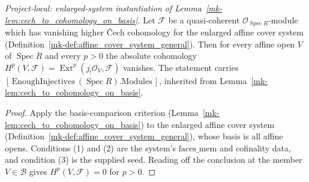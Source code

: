 \begin{lemma}\label{mk-lem:affine_serre_vanishing_general_of_seed}
  \leanok

  \textit{Project-local: enlarged-system instantiation of
  Lemma~\ref{mk-lem:cech_to_cohomology_on_basis}.}
  Let \(\mathcal{F}\) be a quasi-coherent \(\mathcal{O}_{\operatorname{Spec} R}\)-module which has vanishing
  higher {\v C}ech cohomology for the enlarged affine cover system
  (Definition~\ref{mk-def:affine_cover_system_general}). Then for every affine open \(V\) of
  \(\operatorname{Spec} R\) and every \(p > 0\) the absolute cohomology
  \(H^p(V, \mathcal{F}) = \operatorname{Ext}^p(j_!\mathcal{O}_V, \mathcal{F})\) vanishes. The statement
  carries \([\,\mathrm{EnoughInjectives}\ (\operatorname{Spec} R).\mathrm{Modules}\,]\), inherited from
  Lemma~\ref{mk-lem:cech_to_cohomology_on_basis}.
\end{lemma}
\begin{proof}
  \leanok
  Apply the basis-comparison criterion (Lemma~\ref{mk-lem:cech_to_cohomology_on_basis}) to the enlarged
  affine cover system (Definition~\ref{mk-def:affine_cover_system_general}), whose basis is all affine opens.
  Conditions (1) and (2) are the system's \(\mathrm{faces\_mem}\) and cofinality data, and condition (3) is
  the supplied seed. Reading off the conclusion at the member \(V \in \mathcal{B}\) gives
  \(H^p(V, \mathcal{F}) = 0\) for \(p > 0\).
\end{proof}

